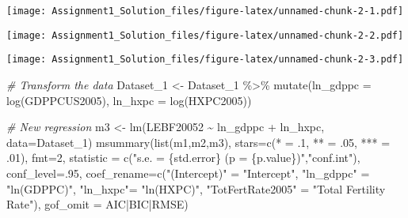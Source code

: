 \documentclass[
]{article}
\newenvironment{Shaded}{\begin{snugshade}}{\end{snugshade}}
\newcommand{\AttributeTok}[1]{\textcolor[rgb]{0.77,0.63,0.00}{#1}}
\newcommand{\CommentTok}[1]{\textcolor[rgb]{0.56,0.35,0.01}{\textit{#1}}}
\newcommand{\DecValTok}[1]{\textcolor[rgb]{0.00,0.00,0.81}{#1}}
\newcommand{\FunctionTok}[1]{\textcolor[rgb]{0.00,0.00,0.00}{#1}}
\newcommand{\NormalTok}[1]{#1}
\newcommand{\OtherTok}[1]{\textcolor[rgb]{0.56,0.35,0.01}{#1}}
\newcommand{\SpecialCharTok}[1]{\textcolor[rgb]{0.00,0.00,0.00}{#1}}
\newcommand{\StringTok}[1]{\textcolor[rgb]{0.31,0.60,0.02}{#1}}
\begin{document}
\texttt{[image: Assignment1\_Solution\_files/figure-latex/unnamed-chunk-2-1.pdf]}

\begin{Shaded}
\end{Shaded}

\texttt{[image: Assignment1\_Solution\_files/figure-latex/unnamed-chunk-2-2.pdf]}

\begin{Shaded}
\end{Shaded}

\texttt{[image: Assignment1\_Solution\_files/figure-latex/unnamed-chunk-2-3.pdf]}

\begin{Shaded}
\begin{Highlighting}[]
\CommentTok{\# Transform the data}
\NormalTok{Dataset\_1 }\OtherTok{\textless{}{-}}\NormalTok{ Dataset\_1 }\SpecialCharTok{\%\textgreater{}\%} \FunctionTok{mutate}\NormalTok{(}\AttributeTok{ln\_gdppc =} \FunctionTok{log}\NormalTok{(GDPPCUS2005),}
                                  \AttributeTok{ln\_hxpc =} \FunctionTok{log}\NormalTok{(HXPC2005))}


\CommentTok{\# New regression}
\NormalTok{m3 }\OtherTok{\textless{}{-}} \FunctionTok{lm}\NormalTok{(LEBF20052 }\SpecialCharTok{\textasciitilde{}}\NormalTok{ ln\_gdppc }\SpecialCharTok{+}\NormalTok{ ln\_hxpc, }\AttributeTok{data=}\NormalTok{Dataset\_1)}
\FunctionTok{msummary}\NormalTok{(}\FunctionTok{list}\NormalTok{(m1,m2,m3),}
         \AttributeTok{stars=}\FunctionTok{c}\NormalTok{(}\StringTok{\textquotesingle{}*\textquotesingle{}} \OtherTok{=}\NormalTok{ .}\DecValTok{1}\NormalTok{, }\StringTok{\textquotesingle{}**\textquotesingle{}} \OtherTok{=}\NormalTok{ .}\DecValTok{05}\NormalTok{, }\StringTok{\textquotesingle{}***\textquotesingle{}} \OtherTok{=}\NormalTok{ .}\DecValTok{01}\NormalTok{),}
         \AttributeTok{fmt=}\DecValTok{2}\NormalTok{,}
         \AttributeTok{statistic =} \FunctionTok{c}\NormalTok{(}\StringTok{"s.e. = \{std.error\} (p = \{p.value\})"}\NormalTok{,}\StringTok{"conf.int"}\NormalTok{),}
         \AttributeTok{conf\_level=}\NormalTok{.}\DecValTok{95}\NormalTok{,}
         \AttributeTok{coef\_rename=}\FunctionTok{c}\NormalTok{(}\StringTok{"(Intercept)"} \OtherTok{=} \StringTok{"Intercept"}\NormalTok{, }\StringTok{"ln\_gdppc"} \OtherTok{=} \StringTok{"ln(GDPPC)"}\NormalTok{, }\StringTok{"ln\_hxpc"}\OtherTok{=} \StringTok{"ln(HXPC)"}\NormalTok{, }
                       \StringTok{"TotFertRate2005"} \OtherTok{=} \StringTok{"Total Fertility Rate"}\NormalTok{),}
         \AttributeTok{gof\_omit =} \StringTok{\textquotesingle{}AIC|BIC|RMSE\textquotesingle{}}\NormalTok{) }
\end{Highlighting}
\end{Shaded}
\end{document}
